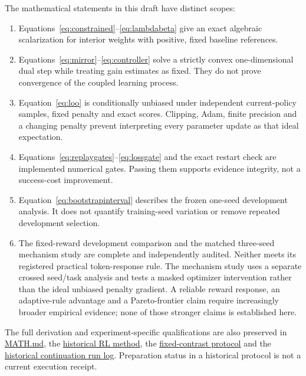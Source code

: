 \documentclass[11pt]{article}
\begin{document}
The mathematical statements in this draft have distinct scopes:
\begin{enumerate}
 \item Equations~\eqref{eq:constrained}--\eqref{eq:lambdabeta} give an exact algebraic scalarization for interior weights with positive, fixed baseline references.
 \item Equations~\eqref{eq:mirror}--\eqref{eq:controller} solve a strictly convex one-dimensional dual step while treating gain estimates as fixed. They do not prove convergence of the coupled learning process.
 \item Equation~\eqref{eq:loo} is conditionally unbiased under independent current-policy samples, fixed penalty and exact scores. Clipping, Adam, finite precision and a changing penalty prevent interpreting every parameter update as that ideal expectation.
 \item Equations~\eqref{eq:replaygates}--\eqref{eq:lossgate} and the exact restart check are implemented numerical gates. Passing them supports evidence integrity, not a success-cost improvement.
 \item Equation~\eqref{eq:bootstrapinterval} describes the frozen one-seed development analysis. It does not quantify training-seed variation or remove repeated development selection.
 \item The fixed-reward development comparison and the matched three-seed mechanism study are complete and independently audited. Neither meets its registered practical token-response rule. The mechanism study uses a separate crossed seed/task analysis and tests a masked optimizer intervention rather than the ideal unbiased penalty gradient. A reliable reward response, an adaptive-rule advantage and a Pareto-frontier claim require increasingly broader empirical evidence; none of those stronger claims is established here.
\end{enumerate}
The full derivation and experiment-specific qualifications are also preserved in \href{https://github.com/arpjw/reward-function/blob/research-v1.1.0/MATH.md}{MATH.md}, the \href{https://github.com/arpjw/reward-function/blob/research-v1.1.0/docs/CAPABILITY_RL_METHOD.md}{historical RL method}, the \href{https://github.com/arpjw/reward-function/blob/research-v1.1.0/docs/REWARD_CONTRAST_METHOD.md}{fixed-contrast protocol} and the \href{https://github.com/arpjw/reward-function/blob/research-v1.1.0/docs/REWARD_CONTINUATION_RUN.md}{historical continuation run log}. Preparation status in a historical protocol is not a current execution receipt.
\end{document}
